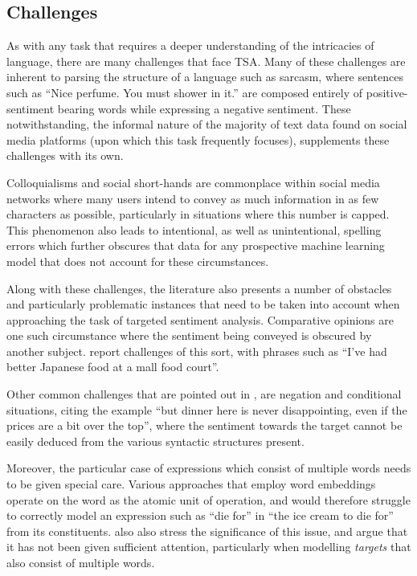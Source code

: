 \documentclass[../../fyp.tex]{subfiles}
\begin{document}
 
\subsection{Challenges}
As with any task that requires a deeper understanding of the intricacies of language, there are many challenges that face TSA. Many of these challenges are inherent to parsing the structure of a language such as sarcasm, where sentences such as \enquote{Nice perfume. You must shower in it.} \citep{kharde2016} are composed entirely of positive-sentiment bearing words while expressing a negative sentiment. These notwithstanding, the informal nature of the majority of text data found on social media platforms (upon which this task frequently focuses), supplements these challenges with its own.

Colloquialisms and social short-hands are commonplace within social media networks where many users intend to convey as much information in as few characters as possible, particularly in situations where this number is capped. This phenomenon also leads to intentional, as well as unintentional, spelling errors which further obscures that data for any prospective machine learning model that does not account for these circumstances.

Along with these challenges, the literature also presents a number of obstacles and particularly problematic instances that need to be taken into account when approaching the task of targeted sentiment analysis. Comparative opinions are one such circumstance where the sentiment being conveyed is obscured by another subject. \citet{tang2016} report challenges of this sort, with phrases such as \enquote{I've had better Japanese food at a mall food court}.

Other common challenges that are pointed out in \citep{tang2016}, are negation and conditional situations, citing the example \enquote{but dinner here is never disappointing, even if the prices are a bit over the top}, where the sentiment towards the target cannot be easily deduced from the various syntactic structures present.

Moreover, the particular case of expressions which consist of multiple words needs to be given special care. Various approaches that employ word embeddings operate on the word as the atomic unit of operation, and would therefore struggle to correctly model an expression such as \enquote{die for} in \enquote{the ice cream to die for} \citep{tang2016} from its constituents. \citet{zheng2018} also also stress the significance of this issue, and argue that it has not been given sufficient attention, particularly when modelling \textit{targets} that also consist of multiple words.
\end{document}
